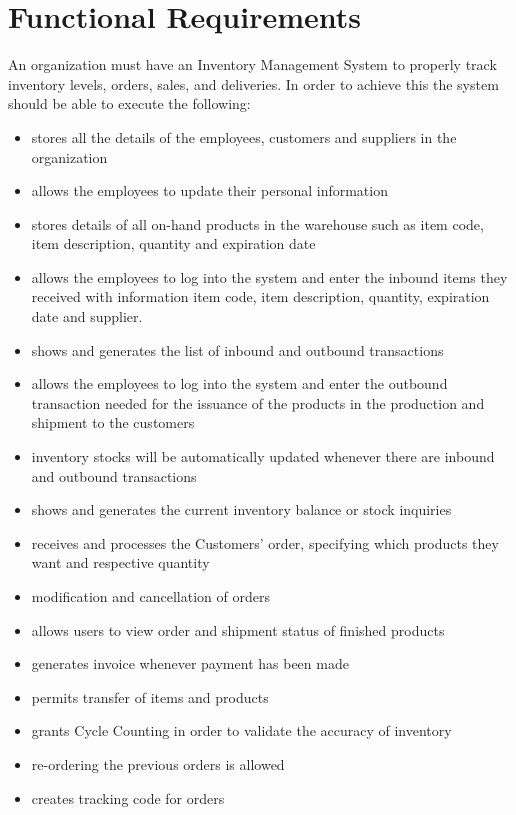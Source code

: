 \section{Functional Requirements}

An organization must have an Inventory Management System to properly track inventory levels, orders, sales, and deliveries. In order to achieve this the system should be able to execute the following:

\begin{itemize}
    \item stores all the details of the employees, customers and suppliers in the organization
    \item allows the employees to update their personal information
    \item stores details of all on-hand products in the warehouse such as item code, item description, quantity and expiration date
    \item allows the employees to log into the system and enter the inbound items they received with information item code, item description, quantity, expiration date and supplier. 
    \item shows and generates the list of inbound and outbound transactions
    \item allows the employees to log into the system and enter the outbound transaction needed for the issuance of the products in the production and shipment to the customers
    \item inventory stocks will be automatically updated whenever there are inbound and outbound transactions
    \item shows and generates the current inventory balance or stock inquiries
    \item receives and processes the Customers’ order, specifying which products they want and respective quantity
    \item modification and cancellation of orders
    \item allows users to view order and shipment status of finished products
    \item generates invoice whenever payment has been made
    \item permits transfer of items and products
    \item grants Cycle Counting in order to validate the accuracy of inventory
    \item re-ordering the previous orders is allowed
    \item creates tracking code for orders
\end{itemize}